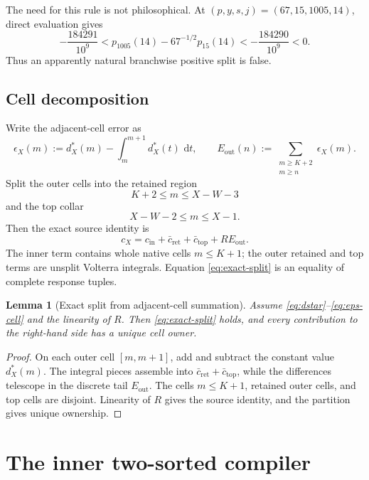 \documentclass[11pt]{article}
\newtheorem{lemma}[theorem]{Lemma}
\theoremstyle{definition}
\theoremstyle{remark}
\newcommand{\1}{\mathbf 1}
\newcommand{\dd}{\,\mathrm d}
\begin{document}
The need for this rule is not philosophical.  At \((p,y,s,j)=(67,15,1005,14)\), direct evaluation gives
\begin{equation}\label{eq:volterra-counterexample}
-\frac{184291}{10^9}
< p_{1005}(14)-67^{-1/2}p_{15}(14)
< -\frac{184290}{10^9}<0.
\end{equation}
Thus an apparently natural branchwise positive split is false.

\subsection{Cell decomposition}

Write the adjacent-cell error as
\begin{equation}\label{eq:eps-cell}
\epsilon_X(m):=d_X^*(m)-\int_m^{m+1}d_X^*(t)\,\dd t,
\qquad
E_{\mathrm{out}}(n):=\sum_{\substack{m\ge K+2\\m\ge n}}\epsilon_X(m).
\end{equation}
Split the outer cells into the retained region
\[
K+2\le m\le X-W-3
\]
and the top collar
\[
X-W-2\le m\le X-1.
\]
Then the exact source identity is
\begin{equation}\label{eq:exact-split}
\boxed{
c_X=c_{\mathrm{in}}+\bar c_{\mathrm{ret}}+\bar c_{\mathrm{top}}+R E_{\mathrm{out}}.}
\end{equation}
The inner term contains whole native cells \(m\le K+1\); the outer retained and top terms are unsplit Volterra integrals.  Equation \eqref{eq:exact-split} is an equality of complete response tuples.

\begin{lemma}[Exact split from adjacent-cell summation]\label{lem:exact-split}
Assume \eqref{eq:dstar}--\eqref{eq:eps-cell} and the linearity of \(R\).  Then \eqref{eq:exact-split} holds, and every contribution to the right-hand side has a unique cell owner.
\end{lemma}

\begin{proof}
On each outer cell \([m,m+1]\), add and subtract the constant value \(d_X^*(m)\).  The integral pieces assemble into \(\bar c_{\mathrm{ret}}+\bar c_{\mathrm{top}}\), while the differences telescope in the discrete tail \(E_{\mathrm{out}}\).  The cells \(m\le K+1\), retained outer cells, and top cells are disjoint.  Linearity of \(R\) gives the source identity, and the partition gives unique ownership.
\end{proof}

\section{The inner two-sorted compiler}\label{sec:inner}
\end{document}
